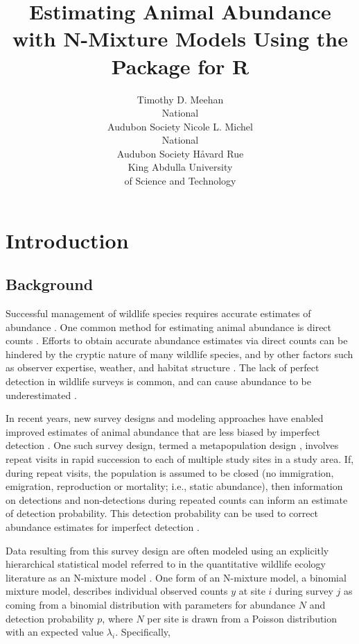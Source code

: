\documentclass[codesnippet]{jss}
\author{Timothy D. Meehan\\National\\Audubon Society \And
	Nicole L. Michel\\National\\Audubon Society \And
	H{\aa}vard Rue\\King Abdulla University\\of Science and Technology}
\title{Estimating Animal Abundance with N-Mixture Models Using the \pkg{R-INLA} Package for R}
\begin{document}
	
\section[Introduction]{Introduction}
\subsection[Background]{Background}
Successful management of wildlife species requires accurate estimates of abundance  \citep{Yoccoz_Nichols_Boulinier_2001}. One common method for estimating animal abundance is direct counts  \citep{Pollock_Nichols_Simons_Farnsworth_Bailey_Sauer_2002}. Efforts to obtain accurate abundance estimates via direct counts can be hindered by the cryptic nature of many wildlife species, and by other factors such as observer expertise, weather, and habitat structure  \citep{Denes_Silveira_Beissinger_2015}. The lack of perfect detection in wildlife surveys is common, and can cause abundance to be underestimated  \citep{Wenger_Freeman_2008, Joseph_Elkin_Martin_Possingham_2009}.

In recent years, new survey designs and modeling approaches have enabled improved estimates of animal abundance that are less biased by imperfect detection \citep{Denes_Silveira_Beissinger_2015}. One such survey design, termed a metapopulation design \citep{Kery_Royle_2010}, involves repeat visits in rapid succession to each of multiple study sites in a study area. If, during repeat visits, the population is assumed to be closed (no immigration, emigration, reproduction or mortality; i.e., static abundance), then information on detections and non-detections during repeated counts can inform an estimate of detection probability. This detection probability can be used to correct abundance estimates for imperfect detection \citep{Royle_2004}.

Data resulting from this survey design are often modeled using an explicitly hierarchical statistical model referred to in the quantitative wildlife ecology literature as an N-mixture model  \citep{Royle_Nichols_2003, Dodd_Dorazio_2004, Royle_2004, Kery_Royle_Schmid_2005}. One form of an N-mixture model, a binomial mixture model, describes individual observed counts $y$ at site $i$ during survey $j$ as coming from a binomial distribution with parameters for abundance $N$ and detection probability $p$, where $N$ per site is drawn from a Poisson distribution with an expected value $\lambda_i$. Specifically,
\end{document}
